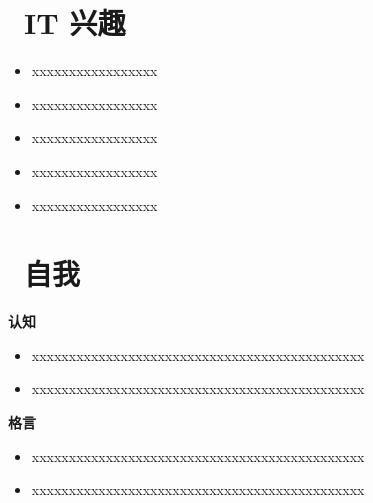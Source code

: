\documentclass{resume}
\begin{document}
\bigbreak

\section{\faBug\ IT 兴趣}
\begin{itemize}[parsep=0.5ex]
  \item xxxxxxxxxxxxxxxxx
  \item xxxxxxxxxxxxxxxxx
  \item xxxxxxxxxxxxxxxxx
  \item xxxxxxxxxxxxxxxxx
  \item xxxxxxxxxxxxxxxxx
\end{itemize}

\bigbreak

\section{\faAt\ 自我}
{\textbf{认知}}
\begin{onehalfspacing}
\begin{itemize}[parsep=0.5ex]
  \item xxxxxxxxxxxxxxxxxxxxxxxxxxxxxxxxxxxxxxxxxxxxx 
  \item xxxxxxxxxxxxxxxxxxxxxxxxxxxxxxxxxxxxxxxxxxxxx 
\end{itemize}
\end{onehalfspacing}

{\textbf{格言}}
\begin{onehalfspacing}
\begin{itemize}[parsep=0.5ex]
  \item xxxxxxxxxxxxxxxxxxxxxxxxxxxxxxxxxxxxxxxxxxxxx 
  \item xxxxxxxxxxxxxxxxxxxxxxxxxxxxxxxxxxxxxxxxxxxxx 
\end{itemize}
\end{onehalfspacing}
\end{document}

